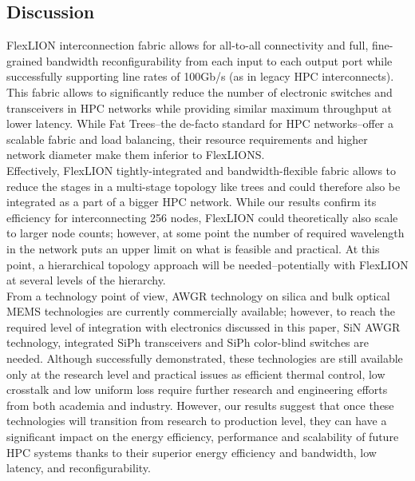 \subsection{Discussion}
FlexLION interconnection fabric allows for all-to-all connectivity and full, fine-grained bandwidth reconfigurability from each input to each output port while successfully supporting line rates of 100Gb/s (as in legacy HPC interconnects). This fabric allows to significantly reduce the number of electronic switches and transceivers in HPC networks while providing similar maximum throughput at lower latency. While Fat Trees--the de-facto standard for HPC networks--offer a scalable fabric and load balancing, their resource requirements and higher network diameter make them inferior to FlexLIONS. \\
Effectively, FlexLION tightly-integrated and bandwidth-flexible fabric allows to reduce the stages in a multi-stage topology like trees and could therefore also be integrated as a part of a bigger HPC network. While our results confirm its efficiency for interconnecting 256 nodes, FlexLION could theoretically also scale to larger node counts; however, at some point the number of required wavelength in the network puts an upper limit on what is feasible and practical. At this point, a hierarchical topology approach will be needed--potentially with FlexLION at several levels of the hierarchy. \\
From a technology point of view, AWGR technology on silica and bulk optical MEMS technologies are currently commercially available; however, to reach the required level of integration with electronics discussed in this paper, SiN AWGR technology, integrated SiPh transceivers and SiPh color-blind switches are needed. Although successfully demonstrated, these technologies are still available only at the research level and practical issues as efficient thermal control, low crosstalk and low uniform loss require further research and engineering efforts from both academia and industry. However, our results suggest that once these technologies will transition from research to production level, they can have a significant impact on the energy efficiency, performance and scalability of future HPC systems thanks to their superior energy efficiency and bandwidth, low latency, and reconfigurability. 

